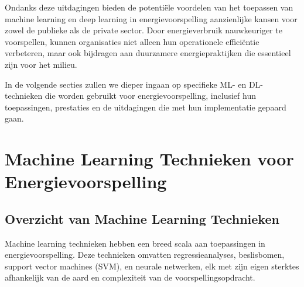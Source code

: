 Ondanks deze uitdagingen bieden de potentiële voordelen van het toepassen van machine learning en deep learning in energievoorspelling aanzienlijke kansen voor zowel de publieke als de private sector. Door energieverbruik nauwkeuriger te voorspellen, kunnen organisaties niet alleen hun operationele efficiëntie verbeteren, maar ook bijdragen aan duurzamere energiepraktijken die essentieel zijn voor het milieu.

In de volgende secties zullen we dieper ingaan op specifieke ML- en DL-technieken die worden gebruikt voor energievoorspelling, inclusief hun toepassingen, prestaties en de uitdagingen die met hun implementatie gepaard gaan.

\section{Machine Learning Technieken voor Energievoorspelling}

\subsection{Overzicht van Machine Learning Technieken}
Machine learning technieken hebben een breed scala aan toepassingen in energievoorspelling. Deze technieken omvatten regressieanalyses, beslisbomen, support vector machines (SVM), en neurale netwerken, elk met zijn eigen sterktes afhankelijk van de aard en complexiteit van de voorspellingsopdracht.

